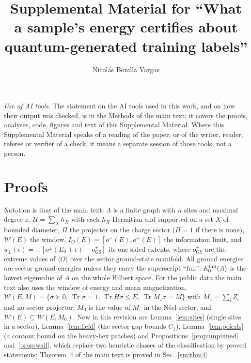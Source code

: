\documentclass[aps,prx,onecolumn,10pt,nofootinbib,longbibliography,floatfix]{revtex4-2}
\theoremstyle{remark}
\newcommand{\W}{\mathcal{W}}
\newcommand{\Tr}{\operatorname{Tr}}
\newcommand{\GS}{\mathrm{GS}}
\begin{document}
\title{Supplemental Material for ``What a sample's energy certifies about quantum-generated training labels''}
\author{Nicol\'as Bonilla Vargas}
\maketitle

\tableofcontents

\noindent\emph{Use of AI tools.} The statement on the AI tools used in this work, and on how their output was
checked, is in the Methods of the main text; it covers the proofs, analyses, code, figures and text of this
Supplemental Material. Where this Supplemental Material speaks of a reading of the paper, or of the writer, reader,
referee or verifier of a check, it means a separate session of those tools, not a person.

\section{Proofs}
\label{sm:proofs}

Notation is that of the main text: $\Lambda$ is a finite graph with $n$ sites and maximal degree $z$,
$H=\sum_Xh_X$ with each $h_X$ Hermitian and supported on a set $X$ of bounded diameter, $\Pi$ the projector on the
charge sector ($\Pi=1$ if there is none), $\W(E)$ the window, $I_O(E)=[o^-(E),o^+(E)]$ the information limit, and %
$u_\pm(\epsilon)=\pm[o^\pm(E_0+\epsilon)-o_\GS^\pm]$ its one-sided extents, where $o_\GS^\pm$ are the extreme values of %
$\langle O\rangle$ over the sector ground-state manifold. All ground energies are sector ground energies unless
they carry the superscript ``full'': $E_0^{\rm full}(A)$ is the lowest eigenvalue of $A$ on the whole Hilbert space.
For the public data the main text also uses the window of energy and mean magnetization,
$\W(E,M)=\{\sigma\succeq0,\ \Tr\sigma=1,\ \Tr H\sigma\le E,\ \Tr M_z\sigma=M\}$ with $M_z=\sum_iZ_i$ and no sector
projector; $M_0$ is the value of $M_z$ in the N\'eel sector, and $\W(E)\subseteq\W(E,M_0)$.
New in this revision are Lemma~\ref{lem:sites} (single sites in a sector), Lemma~\ref{lem:field} (the sector gap
bounds $C_1$), Lemma~\ref{lem:peierls} (a contour bound on the heavy-hex patches) and
Propositions~\ref{prop:unpinned} and~\ref{prop:wall}, which replace two heuristic classes of the classification by
proved statements; Theorem~4 of the main text is proved in Sec.~\ref{sm:thm4}. %
\end{document}
